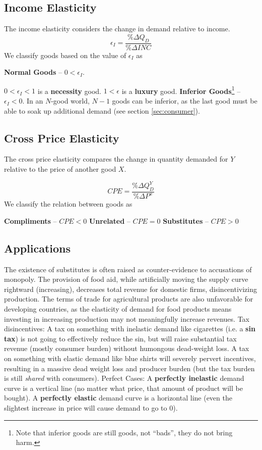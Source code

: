 \documentclass{article}
\def\term #1{\termb{#1} --}
\def\termb #1{\1 \textbf{#1}}
\begin{document}
\subsection{Income Elasticity}
The income elasticity considers the change in demand relative to income.
\[
    \epsilon_I = \frac{\%\Delta Q_D}{\%\Delta INC}
\]
We classify goods based on the value of $\epsilon_I$ as
\begin{outline}
    \term{Normal Goods} $0<\epsilon_I$.

        \2 $0<\epsilon_I<1$ is a \textbf{necessity} good.
        \2 $1<\epsilon$ is a \textbf{luxury} good.
    \termb{Inferior Goods}\footnote{Note that inferior goods are still goods, not ``bads'', they do not bring harm.} --
    $\epsilon_I<0$.
        \2 In an $N$-good world, $N-1$ goods can be inferior, as the last good must be able to soak up additional demand (see section \ref{sec:consumer}).
    \end{outline}

\subsection{Cross Price Elasticity}
The cross price elasticity compares the change in quantity demanded for $Y$ relative to the price of another good $X$.

\[
    CPE = \frac{\%\Delta Q_D^Y}{\%\Delta P^x}
\]
We classify the relation between goods as
\begin{outline}
	\term{Compliments} $CPE<0$
	\term{Unrelated} $CPE=0$
	\term{Substitutes} $CPE>0$
\end{outline}

\subsection{Applications}
\begin{outline}
	\1 The existence of substitutes is often raised as counter-evidence to accusations of monopoly.
	\1 The provision of food aid, while artificially moving the supply curve rightward (increasing), decreases total revenue for domestic firms, disincentivizing production.
	    \2 The terms of trade for agricultural products are also unfavorable for developing countries, as the elasticity of demand for food products means investing in increasing production may not meaningfully increase revenues.
	\1 Tax disincentives:
	    \2 A tax on something with inelastic demand like cigarettes (i.e. a \textbf{sin tax}) is not going to effectively reduce the sin, but will raise substantial tax revenue (mostly consumer burden) without humongous dead-weight loss.
	    \2 A tax on something with elastic demand like blue shirts will severely pervert incentives, resulting in a massive dead weight loss and producer burden (but the tax burden is still \textit{shared} with consumers).
	\1 Perfect Cases:
	    \2 A \textbf{perfectly inelastic} demand curve is a vertical line (no matter what price, that amount of product will be bought).
		\2 A \textbf{perfectly elastic} demand curve is a horizontal line (even the slightest increase in price will cause demand to go to $0$).
\end{outline}
\end{document}
